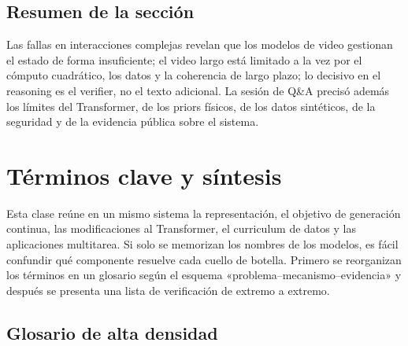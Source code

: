 \documentclass[a4paper]{article}
\begin{document}
\subsection{Resumen de la sección}

Las fallas en interacciones complejas revelan que los modelos de video gestionan el estado de forma insuficiente; el video largo está limitado a la vez por el cómputo cuadrático, los datos y la coherencia de largo plazo; lo decisivo en el reasoning es el verifier, no el texto adicional. La sesión de Q\&A precisó además los límites del Transformer, de los priors físicos, de los datos sintéticos, de la seguridad y de la evidencia pública sobre el sistema.
\section{Términos clave y síntesis}

Esta clase reúne en un mismo sistema la representación, el objetivo de generación continua, las modificaciones al Transformer, el curriculum de datos y las aplicaciones multitarea. Si solo se memorizan los nombres de los modelos, es fácil confundir qué componente resuelve cada cuello de botella. Primero se reorganizan los términos en un glosario según el esquema «problema--mecanismo--evidencia» y después se presenta una lista de verificación de extremo a extremo.

\subsection{Glosario de alta densidad}
\end{document}
